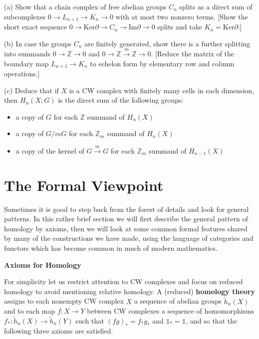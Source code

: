 \begin{exercise}
(a) Show that a chain complex of free abelian groups $C_n$ splits as a direct sum of subcomplexes $0 \to L_{n+1} \to K_n \to 0$ with at most two nonzero terms. [Show the short exact sequence $0 \to \text{Ker}\partial \to C_n \to \text{Im}\partial \to 0$ splits and take $K_n = \text{Ker}\partial$.]

(b) In case the groups $C_n$ are finitely generated, show there is a further splitting into summands $0 \to \mathbb{Z} \to 0$ and $0 \to \mathbb{Z} \xrightarrow{m} \mathbb{Z} \to 0$. [Reduce the matrix of the boundary map $L_{n+1} \to K_n$ to echelon form by elementary row and column operations.]

(c) Deduce that if $X$ is a CW complex with finitely many cells in each dimension, then $H_n(X; G)$ is the direct sum of the following groups:
\begin{itemize}
\item a copy of $G$ for each $\mathbb{Z}$ summand of $H_n(X)$
\item a copy of $G / mG$ for each $\mathbb{Z}_m$ summand of $H_n(X)$
\item a copy of the kernel of $G \xrightarrow{m} G$ for each $\mathbb{Z}_m$ summand of $H_{n-1}(X)$
\end{itemize}
\end{exercise}

\section{The Formal Viewpoint}\label{sec:formal-viewpoint}

Sometimes it is good to step back from the forest of details and look for general patterns. In this rather brief section we will first describe the general pattern of homology by axioms, then we will look at some common formal features shared by many of the constructions we have made, using the language of categories and functors which has become common in much of modern mathematics.

\textbf{Axioms for Homology}

For simplicity let us restrict attention to CW complexes and focus on reduced homology to avoid mentioning relative homology. A (reduced) \textbf{homology theory} assigns to each nonempty CW complex $X$ a sequence of abelian groups $\tilde{h}_n(X)$ and to each map $f : X \to Y$ between CW complexes a sequence of homomorphisms $f_* : \tilde{h}_n(X) \to \tilde{h}_n(Y)$ such that $(fg)_* = f_* g_*$ and $\mathbb{1}_* = \mathbb{1}$, and so that the following three axioms are satisfied.

